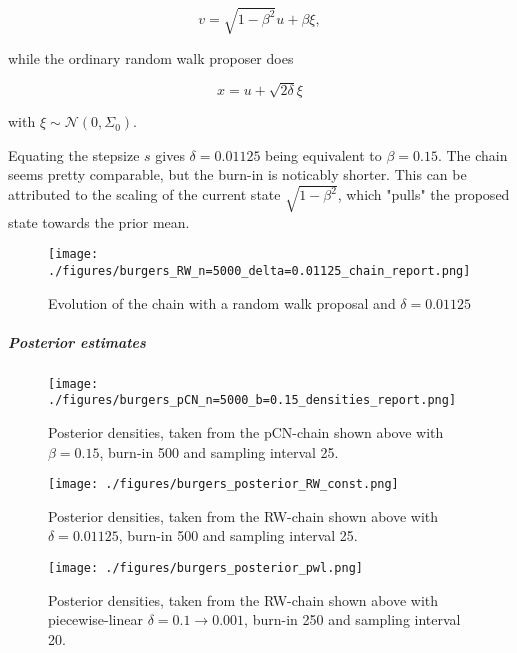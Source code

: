 \documentclass[11pt]{article}
\newcommand{\N}[2]{\mathcal{N}\left(#1,#2\right)}
\begin{document}
$$v = \sqrt{1-\beta^2} u + \beta \xi,$$

while the ordinary random walk proposer does

$$x = u + \sqrt{2\delta}\xi$$

with \(\xi \sim \N{0}{\Sigma_0}\).

Equating the stepsize \(s\) gives \(\delta = 0.01125\) being equivalent to \(\beta = 0.15\).
The chain seems pretty comparable, but the burn-in is noticably shorter.
This can be attributed to the scaling of the current state \(\sqrt{1-\beta^2}\), which "pulls"
the proposed state towards the prior mean.

\begin{figure}[htbp]
\centering
\texttt{[image: ./figures/burgers\_RW\_n=5000\_delta=0.01125\_chain\_report.png]}
\caption{\label{fig:burgers_delta_0}
Evolution of the chain with a random walk proposal and \(\delta = 0.01125\)}
\end{figure}

\subparagraph{Posterior estimates}
\label{sec:org829546d}

\begin{figure}[htbp]
\centering
\texttt{[image: ./figures/burgers\_pCN\_n=5000\_b=0.15\_densities\_report.png]}
\caption{\label{fig:burgers_densities_15}
Posterior densities, taken from the pCN-chain shown above with \(\beta = 0.15\), burn-in 500 and sampling interval 25.}
\end{figure}

\begin{figure}[htbp]
\centering
\texttt{[image: ./figures/burgers\_posterior\_RW\_const.png]}
\caption{\label{fig:burgers_densities_delta_001125}
Posterior densities, taken from the RW-chain shown above with \(\delta = 0.01125\), burn-in 500 and sampling interval 25.}
\end{figure}


\begin{figure}[htbp]
\centering
\texttt{[image: ./figures/burgers\_posterior\_pwl.png]}
\caption{\label{fig:burgers_densities_delta_pwl}
Posterior densities, taken from the RW-chain shown above with piecewise-linear \(\delta = 0.1 \to 0.001\), burn-in 250 and sampling interval 20.}
\end{figure}



\end{document}
